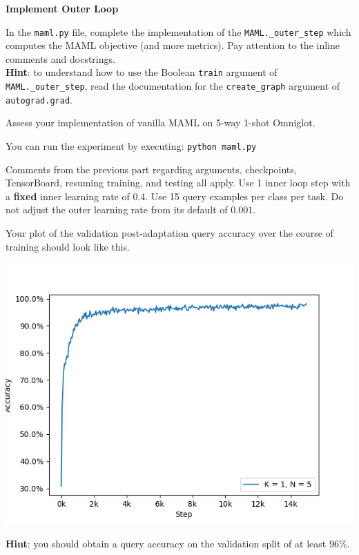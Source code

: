 \item {} {\bf Implement Outer Loop}

In the \texttt{maml.py} file, complete the implementation of the \texttt{MAML.\_outer\_step} which computes the MAML objective (and more metrics). Pay attention to the inline comments and docstrings. \\
\textbf{Hint}: to understand how to use the Boolean \texttt{train} argument of \texttt{MAML.\_outer\_step}, read the documentation for the \texttt{create\_graph} argument of \texttt{autograd.grad}.

Assess your implementation of vanilla MAML on 5-way 1-shot Omniglot. 

You can run the experiment by executing: \texttt{python maml.py}

Comments from the previous part regarding arguments, checkpoints, TensorBoard, resuming training, and testing all apply. Use 1 inner loop step with a \textbf{fixed} inner learning rate of 0.4. Use 15 query examples per class per task. Do not adjust the outer learning rate from its default of $0.001$.

Your plot of the validation post-adaptation query accuracy over the course of training should look like this.
\begin{center}
    \includegraphics[width=0.75\linewidth]{./figures/maml_q1}
\end{center}

\textbf{Hint}: you should obtain a query accuracy on the validation split of at least $96\%$.

